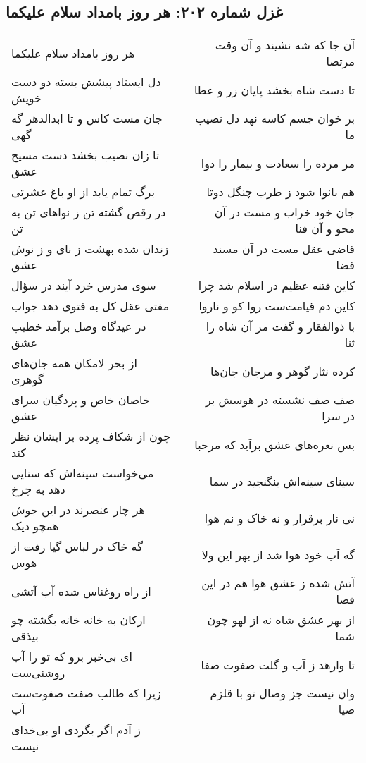 \begin{center}
\section*{غزل شماره ۲۰۲: هر روز بامداد سلام علیکما}
\label{sec:0202}
\begin{longtable}{l p{0.5cm} r}
هر روز بامداد سلام علیکما
&&
آن جا که شه نشیند و آن وقت مرتضا
\\
دل ایستاد پیشش بسته دو دست خویش
&&
تا دست شاه بخشد پایان زر و عطا
\\
جان مست کاس و تا ابدالدهر گه گهی
&&
بر خوان جسم کاسه نهد دل نصیب ما
\\
تا زان نصیب بخشد دست مسیح عشق
&&
مر مرده را سعادت و بیمار را دوا
\\
برگ تمام یابد از او باغ عشرتی
&&
هم بانوا شود ز طرب چنگل دوتا
\\
در رقص گشته تن ز نواهای تن به تن
&&
جان خود خراب و مست در آن محو و آن فنا
\\
زندان شده بهشت ز نای و ز نوش عشق
&&
قاضی عقل مست در آن مسند قضا
\\
سوی مدرس خرد آیند در سؤال
&&
کاین فتنه عظیم در اسلام شد چرا
\\
مفتی عقل کل به فتوی دهد جواب
&&
کاین دم قیامت‌ست روا کو و ناروا
\\
در عیدگاه وصل برآمد خطیب عشق
&&
با ذوالفقار و گفت مر آن شاه را ثنا
\\
از بحر لامکان همه جان‌های گوهری
&&
کرده نثار گوهر و مرجان جان‌ها
\\
خاصان خاص و پردگیان سرای عشق
&&
صف صف نشسته در هوسش بر در سرا
\\
چون از شکاف پرده بر ایشان نظر کند
&&
بس نعره‌های عشق برآید که مرحبا
\\
می‌خواست سینه‌اش که سنایی دهد به چرخ
&&
سینای سینه‌اش بنگنجید در سما
\\
هر چار عنصرند در این جوش همچو دیک
&&
نی نار برقرار و نه خاک و نم هوا
\\
گه خاک در لباس گیا رفت از هوس
&&
گه آب خود هوا شد از بهر این ولا
\\
از راه روغناس شده آب آتشی
&&
آتش شده ز عشق هوا هم در این فضا
\\
ارکان به خانه خانه بگشته چو بیذقی
&&
از بهر عشق شاه نه از لهو چون شما
\\
ای بی‌خبر برو که تو را آب روشنی‌ست
&&
تا وارهد ز آب و گلت صفوت صفا
\\
زیرا که طالب صفت صفوت‌ست آب
&&
وان نیست جز وصال تو با قلزم ضیا
\\
ز آدم اگر بگردی او بی‌خدای نیست

\end{longtable}
\end{center}
